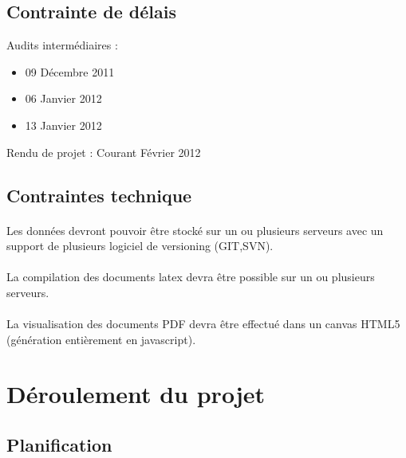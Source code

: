 \documentclass[a4paper,12pt]{article}
\begin{document}
\subsection{Contrainte de délais}

Audits intermédiaires :
\begin{itemize}
 \item 09 Décembre 2011
 \item 06 Janvier 2012
 \item 13 Janvier 2012
\end{itemize}

Rendu de projet : Courant Février 2012

\subsection{Contraintes technique}
 	
\paragraph*{}
Les données devront pouvoir être stocké sur un ou plusieurs serveurs avec un support de plusieurs logiciel de versioning (GIT,SVN).

\paragraph*{}
La compilation des documents latex devra être possible sur un ou plusieurs serveurs.

\paragraph*{}
La visualisation des documents PDF devra être effectué dans un canvas HTML5 (génération entièrement en javascript).

\section{Déroulement du projet}

\subsection{Planification}
\newpage
\end{document}
